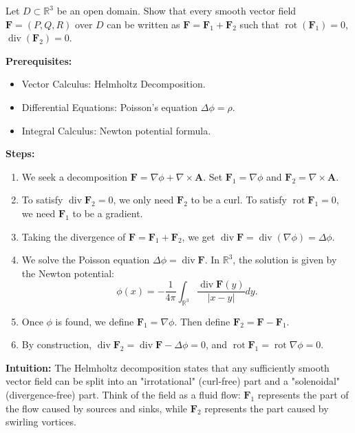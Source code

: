 \begin{exercise}
\label{analysis:2013:10}
Let $D \subset \mathbb{R}^3$ be an open domain. Show that every smooth vector field $\mathbf{F} = (P, Q, R)$ over $D$ can be written as $\mathbf{F} = \mathbf{F}_1 + \mathbf{F}_2$ such that $\operatorname{rot}(\mathbf{F}_1) = 0$, $\operatorname{div}(\mathbf{F}_2) = 0$.
\end{exercise}

\begin{solution}
\textbf{Prerequisites:}
\begin{itemize}
    \item Vector Calculus: Helmholtz Decomposition.
    \item Differential Equations: Poisson's equation $\Delta \phi = \rho$.
    \item Integral Calculus: Newton potential formula.
\end{itemize}

\textbf{Steps:}
\begin{enumerate}
    \item We seek a decomposition $\mathbf{F} = \nabla \phi + \nabla \times \mathbf{A}$. Set $\mathbf{F}_1 = \nabla \phi$ and $\mathbf{F}_2 = \nabla \times \mathbf{A}$.

    \item To satisfy $\operatorname{div} \mathbf{F}_2 = 0$, we only need $\mathbf{F}_2$ to be a curl. To satisfy $\operatorname{rot} \mathbf{F}_1 = 0$, we need $\mathbf{F}_1$ to be a gradient.

    \item Taking the divergence of $\mathbf{F} = \mathbf{F}_1 + \mathbf{F}_2$, we get $\operatorname{div} \mathbf{F} = \operatorname{div}(\nabla \phi) = \Delta \phi$.

    \item We solve the Poisson equation $\Delta \phi = \operatorname{div} \mathbf{F}$. In $\mathbb{R}^3$, the solution is given by the Newton potential:
    \[
    \phi(x) = -\frac{1}{4\pi} \int_{\mathbb{R}^3} \frac{\operatorname{div} \mathbf{F}(y)}{|x-y|} dy.
    \]

    \item Once $\phi$ is found, we define $\mathbf{F}_1 = \nabla \phi$. Then define $\mathbf{F}_2 = \mathbf{F} - \mathbf{F}_1$.

    \item By construction, $\operatorname{div} \mathbf{F}_2 = \operatorname{div} \mathbf{F} - \Delta \phi = 0$, and $\operatorname{rot} \mathbf{F}_1 = \operatorname{rot} \nabla \phi = 0$.
\end{enumerate}

\textbf{Intuition:}
The Helmholtz decomposition states that any sufficiently smooth vector field can be split into an "irrotational" (curl-free) part and a "solenoidal" (divergence-free) part. Think of the field as a fluid flow: $\mathbf{F}_1$ represents the part of the flow caused by sources and sinks, while $\mathbf{F}_2$ represents the part caused by swirling vortices.
\end{solution}


